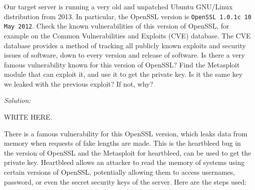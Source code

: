 \documentclass[a4paper,11pt]{article}
\newenvironment{solution}%
{\par{\noindent\small\textit{Solution:}}\vspace{-12pt}\begin{framed}}%
{\end{framed}\par}
\begin{document}
Our target server is running a very old and unpatched Ubuntu GNU/Linux distribution from 2013.
In particular, the OpenSSL version is \texttt{OpenSSL 1.0.1c 10 May 2012}.
Check the known vulnerabilities of this version of OpenSSL, for example on the Common Vulnerabilities and Exploits (CVE) database.
The CVE database provides a method of tracking all publicly known exploits and security issues of software, down to every version and release of software.
Is there a very famous vulnerability known for this version of OpenSSL? Find the Metasploit module that can exploit it, and use it to get the private key. Is it the same key we leaked with the previous exploit? If not, why?

\ifsolution\begin{solution}
WRITE HERE.

There is a famous vulnerability for this OpenSSL version, which leaks data from memory when requests of fake lengths are made. This is the heartbleed bug in the version of OpenSSL and the Metasploit for heartbleed, can be used to get the private key. Heartbleed allows an attacker to read the memory of systems using certain versions of OpenSSL, potentially allowing them to access usernames, password, or even the secret security keys of the server. Here are the steps used:


\end{solution}
\end{document}

